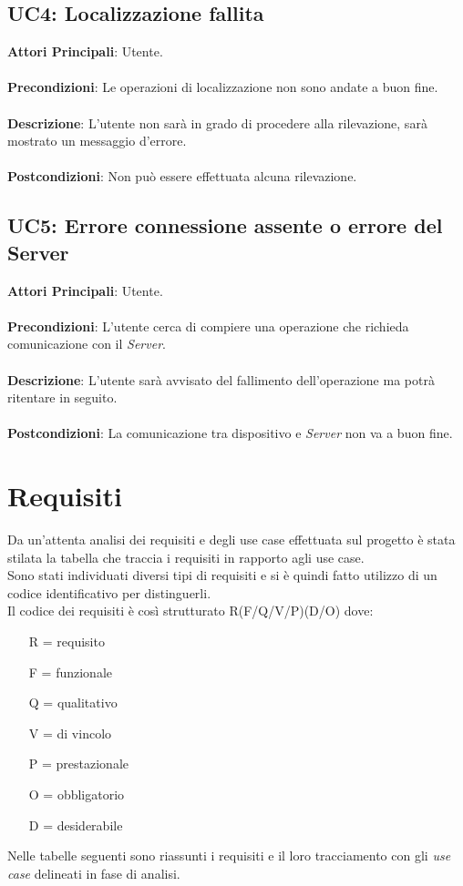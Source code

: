 \subsection{UC4: Localizzazione fallita}
\textbf{Attori Principali}: Utente.
\\\\ \textbf{Precondizioni}: Le operazioni di localizzazione non sono andate a buon fine.
\\\\ \textbf{Descrizione}: L'utente non sarà in grado di procedere alla rilevazione, sarà mostrato un messaggio d'errore.
\\\\ \textbf{Postcondizioni}: Non può essere effettuata alcuna rilevazione.


\subsection{UC5: Errore connessione assente o errore del Server}
\textbf{Attori Principali}: Utente.
\\\\ \textbf{Precondizioni}: L'utente cerca di compiere una operazione che richieda comunicazione con il \emph{Server}.
\\\\ \textbf{Descrizione}: L'utente sarà avvisato del fallimento dell'operazione ma potrà ritentare in seguito.
\\\\ \textbf{Postcondizioni}: La comunicazione tra dispositivo e \emph{Server} non va a buon fine.



\section{Requisiti}

Da un'attenta analisi dei requisiti e degli use case effettuata sul progetto è stata stilata la tabella che traccia i requisiti in rapporto agli use case.\\
Sono stati individuati diversi tipi di requisiti e si è quindi fatto utilizzo di un codice identificativo per distinguerli.\\
Il codice dei requisiti è così strutturato R(F/Q/V/P)(D/O) dove:
\begin{enumerate}
	\item[R =] requisito
	
    \item[F =] funzionale
    \item[Q =] qualitativo
    \item[V =] di vincolo
    \item[P =] prestazionale
    
    \item[O =] obbligatorio
    \item[D =] desiderabile
\end{enumerate}
Nelle tabelle seguenti sono riassunti i requisiti e il loro tracciamento con gli \emph{use case} delineati in fase di analisi.

